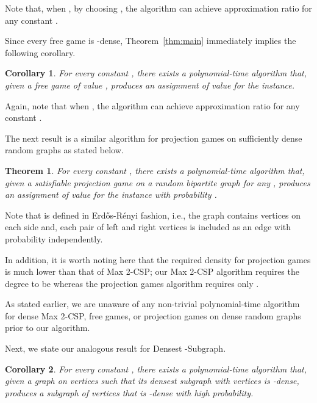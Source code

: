 \documentclass{article}
\newtheorem{theorem}{Theorem}
\newtheorem{corollary}{Corollary}
\begin{document}
Note that, when , by choosing , the algorithm can achieve  approximation ratio for any constant .

Since every free game is -dense, Theorem~\ref{thm:main} immediately implies the following corollary. \\

\begin{corollary} \label{cor:free-game}
  For every constant , there exists a polynomial-time algorithm that, given a free game of value , produces an assignment of value  for the instance.
\end{corollary}

Again, note that when , the algorithm can achieve  approximation ratio for any constant .

The next result is a similar algorithm for projection games on sufficiently dense random graphs as stated below. \\

\begin{theorem} \label{thm:dense-random-proj}
  For every constant , there exists a polynomial-time algorithm that, given a satisfiable projection game on a random bipartite graph  for any , produces an assignment of value  for the instance with probability .
\end{theorem}

Note that  is defined in Erd\H{o}s-R\'{e}nyi fashion, i.e., the graph contains  vertices on each side and, each pair of left and right vertices is included as an edge with probability  independently.

In addition, it is worth noting here that the required density for projection games is much lower than that of {\sc Max 2-CSP}; our {\sc Max 2-CSP} algorithm requires the degree to be  whereas the projection games algorithm requires only .

As stated earlier, we are unaware of any non-trivial polynomial-time algorithm for dense {\sc Max 2-CSP}, free games, or projection games on dense random graphs prior to our algorithm.

Next, we state our analogous result for {\sc Densest -Subgraph}. \\

\begin{corollary} \label{cor:dks}
  For every constant , there exists a polynomial-time algorithm that, given a graph  on  vertices such that its densest subgraph with  vertices is -dense, produces a subgraph of  vertices that is -dense with high probability.
\end{corollary}
\end{document}
